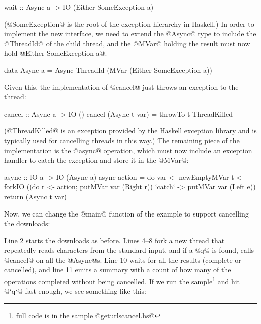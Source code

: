 \begin{haskell}
wait :: Async a -> IO (Either SomeException a)
\end{haskell}

\noindent (@SomeException@ is the root of the exception hierarchy in Haskell.)
In order to implement the new interface, we need to extend the @Async@
type to include the @ThreadId@ of the child thread, and the @MVar@
holding the result must now hold @Either SomeException a@.

\begin{haskell}
data Async a = Async ThreadId (MVar (Either SomeException a))
\end{haskell}

\noindent Given this, the implementation of @cancel@ just throws an
exception to the thread:

\begin{haskell}
cancel :: Async a -> IO ()
cancel (Async t var) = throwTo t ThreadKilled
\end{haskell}

\noindent (@ThreadKilled@ is an exception provided by the Haskell exception
library and is typically used for cancelling threads in this way.)
The remaining piece of the implementation is the @async@ operation,
which must now include an exception handler to catch the exception and
store it in the @MVar@:

\begin{haskell}
async :: IO a -> IO (Async a)
async action = do
   var <- newEmptyMVar
   t <- forkIO ((do r <- action; putMVar var (Right r))
                  `catch` \e -> putMVar var (Left e))
   return (Async t var)
\end{haskell}

Now, we can change the @main@ function of the example to support
cancelling the downloads:


\noindent Line 2 starts the downloads as before.  Lines 4--8 fork a
new thread that repeatedly reads characters from the standard input,
and if a @q@ is found, calls @cancel@ on all the @Async@s.  Line 10
waits for all the results (complete or cancelled), and line 11 emits a
summary with a count of how many of the operations completed without
being cancelled.  If we run the sample\footnote{full code is in the
  sample @geturlscancel.hs@} and hit @`q`@ fast enough, we see
something like this:

